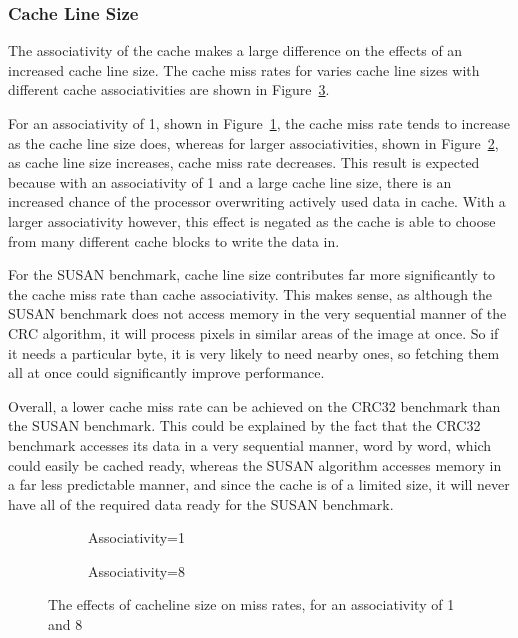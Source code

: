\subsubsection{Cache Line Size}

The associativity of the cache makes a large difference on the effects of an increased cache
line size.
The cache miss rates for varies cache line sizes with different cache associativities are
shown in Figure~\ref{fig:partb-cacheline}.

For an associativity of 1, shown in Figure~\ref{fig:partb-2d1},
the cache miss rate tends to increase as the cache line size
does, whereas for larger associativities, shown in Figure~\ref{fig:partb-2d8},
as cache line size increases, cache miss rate
decreases.
This result is expected because with an associativity of 1 and a large cache line size,
there is an increased chance of the processor overwriting actively used data in cache.
With a larger associativity however, this effect is negated as the cache is able to choose
from many different cache blocks to write the data in.

For the SUSAN benchmark, cache line size contributes far more significantly to the cache
miss rate than cache associativity. This makes sense, as although the SUSAN benchmark
does not access memory in the very sequential manner of the CRC algorithm, it will process
pixels in similar areas of the image at once.
So if it needs
a particular byte, it is very likely to need nearby ones, so fetching them all at once could
significantly improve performance.

Overall, a lower cache miss rate can be achieved on the CRC32 benchmark than the SUSAN
benchmark. This could be explained by the fact that the CRC32 benchmark accesses its data
in a very sequential
manner, word by word, which could easily be cached ready, whereas the SUSAN algorithm accesses
memory in a far less predictable manner, and since the cache is of a limited size, it will
never have all of the required data ready for the SUSAN benchmark.

\begin{figure}[H]%
\hfill%
\begin{subfigure}{.4\textwidth}
    \centering
    
    \caption{Associativity=1}
    \label{fig:partb-2d1}
\end{subfigure}%
\hfill%
\begin{subfigure}{.4\textwidth}
    \centering
    
    \caption{Associativity=8}
    \label{fig:partb-2d8}
\end{subfigure}%
\hfill\null%
\caption{The effects of cacheline size on miss rates, for an associativity of 1 and 8}
\label{fig:partb-cacheline}
\end{figure}
